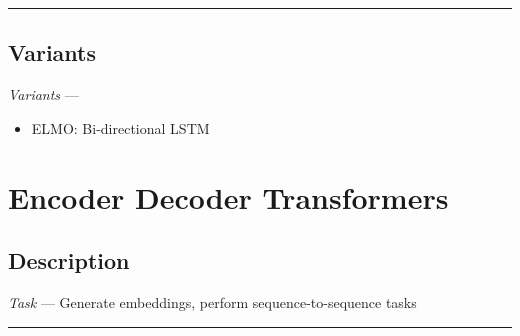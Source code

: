 {\color{black}\hrule height 0.001mm}

\subsection*{Variants}
\emph{Variants} --- 
\begin{itemize}
    \item ELMO: Bi-directional LSTM
\end{itemize}

\section{Encoder Decoder Transformers}
\subsection*{Description}
\emph{Task} --- Generate embeddings, perform sequence-to-sequence tasks

{\color{black}\hrule height 0.001mm}

